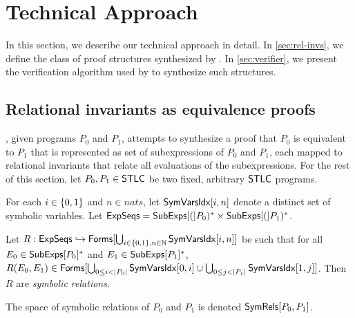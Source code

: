 \section{Technical Approach}
%
In this section, we describe our technical approach in detail.
%
In \autoref{sec:rel-invs}, we define the class of proof
structures synthesized by \sys.
%
In \autoref{sec:verifier}, we present the verification algorithm used
by \sys to synthesize such structures.

\subsection{Relational invariants as equivalence proofs}
\label{sec:rel-invs}
%
\sys, given programs $P_0$ and $P_1$, attempts to synthesize a proof
that $P_0$ is equivalent to $P_1$ that is represented as set of
subexpressions of $P_0$ and $P_1$, each mapped to relational
invariants that relate all evaluations of the subexpressions.
%
For the rest of this section, let $P_0, P_1 \in \mathsf{STLC}$ be two fixed,
arbitrary $\mathsf{STLC}$ programs.

For each $i \in \{ 0, 1 \}$ and $n \in nats$, let $\mathsf{SymVarsIdx}[ i, n ]$
denote a distinct set of symbolic variables.
%
Let $\mathsf{ExpSeqs} = \mathsf{SubExps}[ ( ]P_0)^{*} \times \mathsf{SubExps}[ ( ]P_1)^{*}$.
%
\begin{defn}
  \label{defn:sym-rels}
  Let $R: \mathsf{ExpSeqs} \hookrightarrow \mathsf{Forms}[  \bigcup_{i \in \{ 0 ,
        1 \}, n \in \mathbb{N} } \mathsf{SymVarsIdx}[ i, n ]  ]$ be such that %
  for all $E_0 \in \mathsf{SubExps}[ P_0 ]^{*}$ and $E_1 \in \mathsf{SubExps}[ P_1 ]^{*}$,
  $R(E_0, E_1) \in \formulas{ %
    \bigunion_{ 0 \leq i < |P_0|} \symvarsidx{0}{i} \union %
    \bigunion_{0 \leq j < |P_1|} \symvarsidx{1}{j} }$.
  Then $R$ are \emph{symbolic relations}.
\end{defn}
%
The space of symbolic relations of $P_0$ and $P_1$ is denoted
$\mathsf{SymRels}[ P_0, P_1 ]$.


